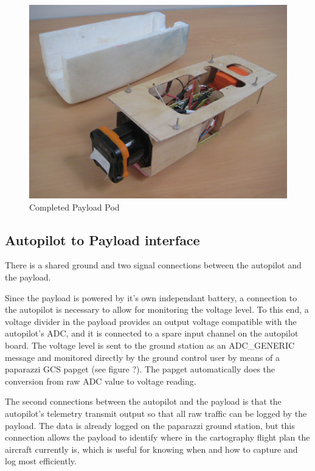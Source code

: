 \documentclass[a4paper,11pt]{report}
\begin{document}
\begin{figure}[ht]
 \centering
 \includegraphics[width=12cm]{Mentor1_payload2.jpg}
 \caption{Completed Payload Pod}
 \label{fig:payload}
\end{figure}

\subsection{Autopilot to Payload interface}

There is a shared ground and two signal connections between the autopilot and the payload.

Since the payload is powered by it's own independant battery, a connection to the autopilot is necessary to allow for monitoring the voltage level. To this end, a voltage divider in the payload provides an output voltage compatible with the autopilot's ADC, and it is connected to a spare input channel on the autopilot board. The voltage level is sent to the ground station as an ADC\_GENERIC message and monitored directly by the ground control user by means of a paparazzi GCS papget (see figure ?). The papget automatically does the conversion from raw ADC value to voltage reading.

The second connections between the autopilot and the payload is that the autopilot's telemetry transmit output so that all raw traffic can be logged by the payload. The data is already logged on the paparazzi ground station, but this connection allows the payload to identify where in the cartography flight plan the aircraft currently is, which is useful for knowing when and how to capture and log most efficiently.
\end{document}
